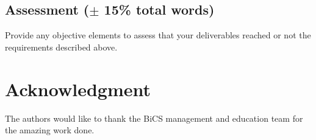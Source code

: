 \subsection{Assessment ($\pm$ 15\% total words)}
Provide any objective elements to assess that your deliverables reached or not the requirements described above. 
\section*{Acknowledgment}
The authors would like to thank the BiCS management and education team for the amazing work done.